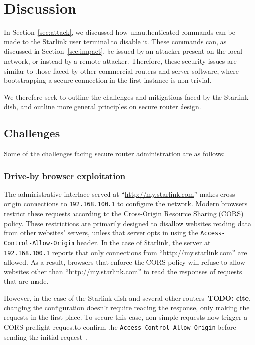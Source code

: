 \section{Discussion}\label{sec:discussion}

In Section~\ref{sec:attack}, we discussed how unauthenticated commands can be made to the Starlink user terminal to disable it.
These commands can, as discussed in Section~\ref{sec:impact}, be issued by an attacker present on the local network, or instead by a remote attacker.
Therefore, these security issues are similar to those faced by other commercial routers and server software, where bootstrapping a secure connection in the first instance is non-trivial.

We therefore seek to outline the challenges and mitigations faced by the Starlink dish, and outline more general principles on secure router design.

\subsection{Challenges}

Some of the challenges facing secure router administration are as follows:

\subsubsection{Drive-by browser exploitation}

The administrative interface served at ``\url{http://my.starlink.com}'' makes cross-origin connections to \texttt{192.168.100.1} to configure the network.
Modern browsers restrict these requests according to the Cross-Origin Resource Sharing (CORS) policy.
These restrictions are primarily designed to disallow websites reading data from other websites' servers, unless that server opts in using the \texttt{Access-Control-Allow-Origin} header.
In the case of Starlink, the server at \texttt{192.168.100.1} reports that only connections from ``\url{http://my.starlink.com}'' are allowed.
As a result, browsers that enforce the CORS policy will refuse to allow websites other than ``\url{http://my.starlink.com}'' to read the responses of requests that are made.

However, in the case of the Starlink dish and several other routers~\textbf{TODO: cite}, changing the configuration doesn't require reading the response, only making the requests in the first place.
To secure this case, non-simple requests now trigger a CORS preflight requestto confirm the \texttt{Access-Control-Allow-Origin} before sending the initial request~\cite{simple_requests, preflight_request}.

